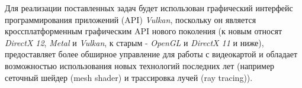Для реализации поставленных задач будет использован графический интерфейс программирования приложений (API) \textit{Vulkan}, поскольку он является кроссплатформенным графическим API нового поколения (к новым относят \textit{DirectX 12}, \textit{Metal} и \textit{Vulkan}, к старым - \textit{OpenGL} и \textit{DirectX 11} и ниже), предоставляет более обширное управление для работы с видеокартой и обладает возможностью использования новых технологий последних лет (например сеточный шейдер (mesh shader) и трассировка лучей (ray tracing)).

\newpage
